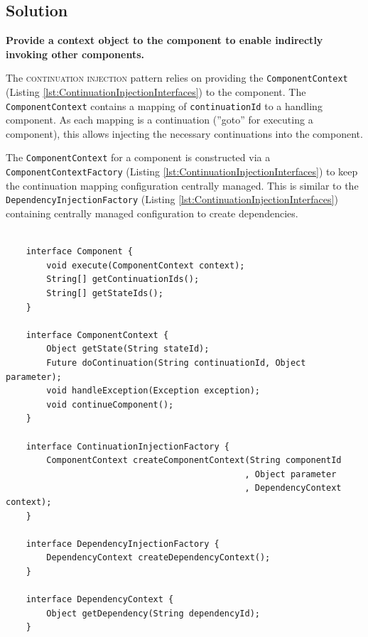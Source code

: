 \documentclass[prodmode]{style/acmlarge}
\begin{document}
\subsection{Solution}

\textbf{Provide a context object to the component to enable indirectly invoking other components.}

The \textsc{continuation injection} pattern relies on providing the
\texttt{ComponentContext} (Listing \ref{lst:ContinuationInjectionInterfaces}) to the
component.  The \texttt{ComponentContext} contains a mapping of
\texttt{continuationId} to a handling component.  As each mapping is a
continuation (''goto'' for executing a component), this allows injecting the
necessary continuations into the component.

The \texttt{ComponentContext} for a component is constructed via a
\texttt{ComponentContextFactory} (Listing \ref{lst:ContinuationInjectionInterfaces})
to keep the continuation mapping configuration centrally managed.  This is
similar to the \texttt{DependencyInjectionFactory} (Listing
\ref{lst:ContinuationInjectionInterfaces}) containing centrally managed
configuration to create dependencies.

\begin{lstlisting}[float,label=lst:ContinuationInjectionInterfaces]

    interface Component {
        void execute(ComponentContext context);
        String[] getContinuationIds();
        String[] getStateIds();
    }

    interface ComponentContext {
        Object getState(String stateId);
        Future doContinuation(String continuationId, Object parameter);
        void handleException(Exception exception);
        void continueComponent();
    }
    
    interface ContinuationInjectionFactory {
        ComponentContext createComponentContext(String componentId
                                               , Object parameter
                                               , DependencyContext context);
    }
    
    interface DependencyInjectionFactory {
        DependencyContext createDependencyContext();
    }
    
    interface DependencyContext {
        Object getDependency(String dependencyId);
    }
\end{lstlisting}
\end{document}

